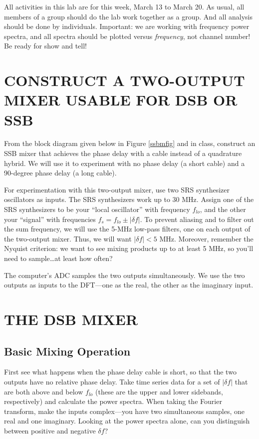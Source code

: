\documentclass[11pt,preprint]{aastex}
\begin{document}
All activities in this lab are for this week, March 13 to March 20. As
usual, all members of a group should do the lab work together as a
group. And all analysis should be done by individuals. Important: we are
working with frequency power spectra, and all spectra should be plotted
versus {\it frequency}, not channel number! Be ready for show and tell!

\section{ CONSTRUCT A TWO-OUTPUT MIXER USABLE FOR DSB OR SSB}
\label{upperlowerdsb}

From the block diagram given below in Figure \ref{ssbmfig} and in class,
construct an SSB mixer that achieves the phase delay with a cable
instead of a quadrature hybrid. We will use it to experiment with no
phase delay (a short cable) and a 90-degree phase delay (a long cable).

For experimentation with this two-output mixer, use two SRS synthesizer
oscillators as inputs.  The SRS synthesizers work up to 30 MHz.  Assign
one of the SRS synthesizers to be your ``local oscillator'' with
frequency $f_{lo}$, and the other your ``signal'' with frequencies $f_s
= f_{lo} \pm |\delta f|$.  To prevent aliasing and to filter out the sum
frequency, we will use the 5-MHz low-pass filters, one on each output of
the two-output mixer. Thus, we will want $|\delta f| < 5$ MHz. Moreover,
remember the Nyquist criterion: we want to see mixing products up to at
least 5 MHz, so you'll need to sample\dots at least how often?

The computer's ADC samples the two outputs simultaneously. We use the
two outputs as inputs to the DFT---one as the real, the other as the
imaginary input.

\section{THE DSB MIXER}

\subsection{Basic Mixing Operation} \label{basicdsb}

First see what happens when the phase delay cable is short, so that the
two outputs have no relative phase delay. Take time series data for a
set of $|\delta f|$ that are both above and below $f_{lo}$ (these are
the upper and lower sidebands, respectively) and calculate the power
spectra. When taking the Fourier transform, make the inputs
complex---you have two simultaneous samples, one real and one
imaginary. Looking at the power spectra alone, can you distinguish
between positive and negative $\delta f$?
\end{document}
